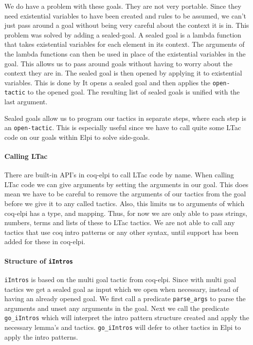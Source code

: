\documentclass[thesis.tex]{subfiles}
\begin{document}
{{We do have a problem with these goals. They are not very portable. Since they need existential variables to have been created and rules to be assumed, we can't just pass around a goal without being very careful about the context it is in. This problem was solved by adding a sealed-goal. A sealed goal is a lambda function that takes existential variables for each element in its context. The arguments of the lambda functions can then be used in place of the existential variables in the goal. This allows us to pass around goals without having to worry about the context they are in. The sealed goal is then opened by applying it to existential variables. This is done by  It opens a sealed goal and then applies the \texttt{open-tactic} to the opened goal. The resulting list of sealed goals is unified with the last argument.

Sealed goals allow us to program our tactics in separate steps, where each step is an \texttt{open-tactic}. This is especially useful since we have to call quite some LTac code on our goals within Elpi to solve side-goals.

\paragraph*{Calling LTac}
There are built-in API's in coq-elpi to call LTac code by name. When calling LTac code we can give arguments by setting the arguments in our goal. This does mean we have to be careful to remove the arguments of our tactics from the goal before we give it to any called tactics. Also, this limits us to arguments of which coq-elpi has a type, and mapping. Thus, for now we are only able to pass strings, numbers, terms and lists of these to LTac tactics. We are not able to call any tactics that use coq intro patterns or any other syntax, until support has been added for these in coq-elpi.

\paragraph*{Structure of \texttt{iIntros}}
\texttt{iIntros} is based on the multi goal tactic from coq-elpi. Since with multi goal tactics we get a sealed goal as input which we open when necessary, instead of having an already opened goal. We first call a predicate \texttt{parse_args} to parse the arguments and unset any arguments in the goal. Next we call the predicate \texttt{go_iIntros} which will interpret the intro pattern structure created and apply the necessary lemma's and tactics. \texttt{go_iIntros} will defer to other tactics in Elpi to apply the intro patterns.

}}
\end{document}
